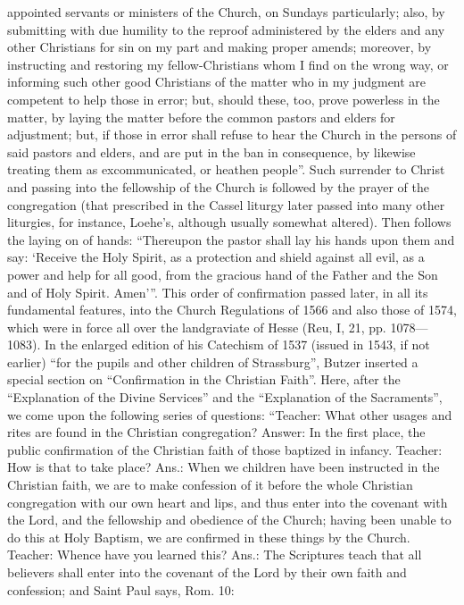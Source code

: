 appointed servants or ministers of the Church, on Sundays particularly; also, by submitting with due humility to the reproof administered by the elders and any other Christians for sin on my part and making proper amends; moreover, by instructing and restoring my fellow-Christians whom I find on the wrong way, or informing such other good Christians of the matter who in my judgment are competent to help those in error; but, should these, too, prove powerless in the matter, by laying the matter before the common pastors and elders for adjustment; but, if those in error shall refuse to hear the Church in the persons of said pastors and elders, and are put in the ban in consequence, by likewise treating them as excommunicated, or heathen people”. Such surrender to Christ and passing into the fellowship of the Church is followed by the prayer of the congregation (that prescribed in the Cassel liturgy later passed into many other liturgies, for instance, Loehe’s, although usually somewhat altered). Then follows the laying on of hands: “Thereupon the pastor shall lay his hands upon them and say: ‘Receive the Holy Spirit, as a protection and shield against all evil, as a power and help for all good, from the gracious hand of the Father and the Son and of Holy Spirit. Amen’”. This order of confirmation passed later, in all its fundamental features, into the Church Regulations of 1566 and also those of 1574, which were in force all over the landgraviate of Hesse (Reu, I, 21, pp. 1078—1083). In the enlarged edition of his Catechism of 1537 (issued in 1543, if not earlier) “for the pupils and other children of Strassburg”, Butzer inserted a special section on “Confirmation in the Christian Faith”. Here, after the “Explanation of the Divine Services” and the “Explanation of the Sacraments”, we come upon the following series of questions: “Teacher: What other usages and rites are found in the Christian congregation? Answer: In the first place, the public confirmation of the Christian faith of those baptized in infancy. Teacher: How is that to take place? Ans.: When we children have been instructed in the Christian faith, we are to make confession of it before the whole Christian congregation with our own heart and lips, and thus enter into the covenant with the Lord, and the fellowship and obedience of the Church; having been unable to do this at Holy Baptism, we are confirmed in these things by the Church. Teacher: Whence have you learned this? Ans.: The Scriptures teach that all believers shall enter into the covenant of the Lord by their own faith and confession; and Saint Paul says, Rom. 10:
